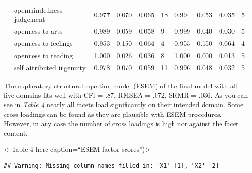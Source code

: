 \documentclass[man]{apa6}
\theoremstyle{definition}
\theoremstyle{definition}
\theoremstyle{definition}
\theoremstyle{remark}
\begin{document}
\begin{table}
{\begin{tabular}[t]{llllllllll}
 & openmindedness judgement & 0.977 & 0.070 & 0.065 & 18 & 0.994 & 0.053 & 0.035 & 5\\
 & openness to arts & 0.989 & 0.059 & 0.058 & 9 & 0.999 & 0.040 & 0.030 & 5\\
 & openness to feelings & 0.953 & 0.150 & 0.064 & 4 & 0.953 & 0.150 & 0.064 & 4\\
 & openness to reading & 1.000 & 0.026 & 0.036 & 8 & 1.000 & 0.000 & 0.013 & 5\\
 & self attributed ingenuity & 0.978 & 0.070 & 0.059 & 11 & 0.996 & 0.048 & 0.032 & 5\\
\bottomrule
\end{tabular}}
\end{table}

The exploratory structural equation model (ESEM) of the final model with
all five domains fits well with CFI = .87, RMSEA = .072, SRMR = .036. As
you can see in \emph{Table 4} nearly all facets load significantly on
their intended domain. Some cross loadings can be found as they are
plausible with ESEM procedures. However, in any case the number of cross
loadings is high nor against the facet content.

\textless{} Table 4 here caption=\enquote{ESEM factor
scores})\textgreater{}

\begin{verbatim}
## Warning: Missing column names filled in: 'X1' [1], 'X2' [2]
\end{verbatim}
\end{document}
